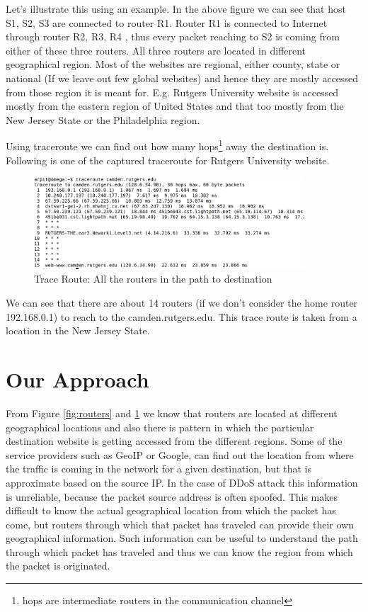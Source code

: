 \documentclass[12pt,oneside,a4paper]{article}
\begin{document}
Let's illustrate this using an example. In the above figure we can see that host S1, S2, S3 are connected to router R1. Router R1 is connected to Internet through router R2, R3, R4 , thus every packet reaching to S2 is coming from either of these three routers. All three routers are located in different geographical region. Most of the websites are regional, either county, state or national (If we leave out few global websites) and hence they are mostly accessed from those region it is meant for. E.g. Rutgers University website is accessed mostly from the eastern region of United States and that too mostly from the New Jersey State or the Philadelphia region.\par
Using traceroute we can find out how many hops\footnote{hops are intermediate routers in the communication channel} away the destination is. Following is one of the captured traceroute for Rutgers University website.\par
\begin{figure}[H]
\centering
\includegraphics[width=0.90\textwidth]{TraceRoute.png}
\caption{Trace Route: All the routers in the path to destination} \label{fig:traceroute}
\end{figure}

We can see that there are about 14 routers (if we don't consider the home router 192.168.0.1) to reach to the camden.rutgers.edu. This trace route is taken from a location in the New Jersey State.\par

\section{Our Approach}

From Figure \ref{fig:routers} and \ref{fig:traceroute} we know that routers are located at different geographical locations and also there is pattern in which the particular destination website is getting accessed from the different regions. Some of the service providers such as  GeoIP or Google, can find out the location from where the traffic is coming in the network for a given destination, but that is approximate based on the source IP. In the case of DDoS attack this information is unreliable, because the packet source address is often spoofed. This makes difficult to know the actual geographical location from which the packet has come, but routers through which that packet has traveled can provide their own geographical information. Such information can be useful to understand the path through which packet has traveled and thus we can know the region from which the packet is originated.\par
\end{document}
